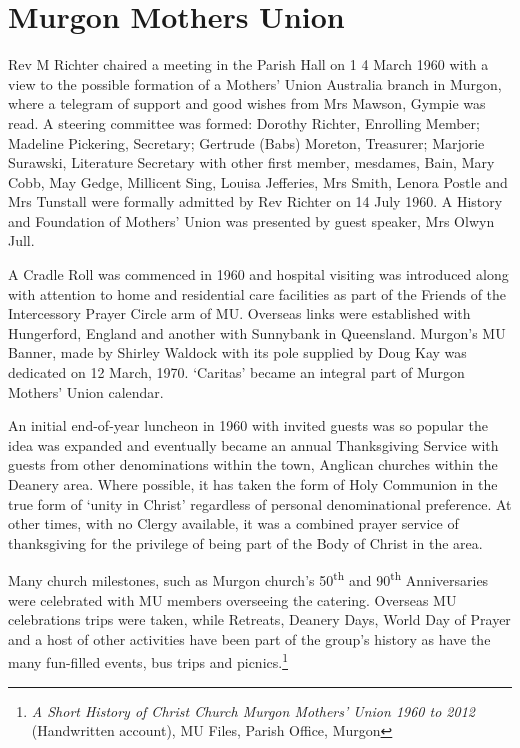 \section{Murgon Mothers Union}



Rev M Richter chaired a meeting in the Parish Hall on 1 4 March 1960 with a view to the possible formation of a Mothers' Union Australia branch in Murgon, where a telegram of support and good wishes from Mrs Mawson, Gympie was read. A steering committee was formed: Dorothy Richter, Enrolling Member; Madeline Pickering, Secretary; Gertrude (Babs) Moreton, Treasurer; Marjorie Surawski, Literature Secretary with other first member, mesdames, Bain, Mary Cobb, May Gedge, Millicent Sing, Louisa Jefferies, Mrs Smith, Lenora Postle and Mrs Tunstall were formally admitted by Rev Richter on 14 July 1960. A History and Foundation of Mothers' Union was presented by guest speaker, Mrs Olwyn Jull.



A Cradle Roll was commenced in 1960 and hospital visiting was introduced along with attention to home and residential care facilities as part of the Friends of the Intercessory Prayer Circle arm of MU. Overseas links were established with Hungerford, England and another with Sunnybank in Queensland. Murgon's MU Banner, made by Shirley Waldock with its pole supplied by Doug Kay was dedicated on 12 March, 1970. `Caritas' became an integral part of Murgon Mothers' Union calendar.



An initial end-of-year luncheon in 1960 with invited guests was so popular the idea was expanded and eventually became an annual Thanksgiving Service with guests from other denominations within the town, Anglican churches within the Deanery area. Where possible, it has taken the form of Holy Communion in the true form of `unity in Christ' regardless of personal denominational preference. At other times, with no Clergy available, it was a combined prayer service of thanksgiving for the privilege of being part of the Body of Christ in the area.



Many church milestones, such as Murgon church's 50\textsuperscript{th} and 90\textsuperscript{th} Anniversaries were celebrated with MU members overseeing the catering. Overseas MU celebrations trips were taken, while Retreats, Deanery Days, World Day of Prayer and a host of other activities have been part of the group's history as have the many fun-filled events, bus trips and picnics.\footnote{\emph{A Short History of Christ Church Murgon Mothers' Union 1960 to 2012} (Handwritten account), MU Files, Parish Office, Murgon}


